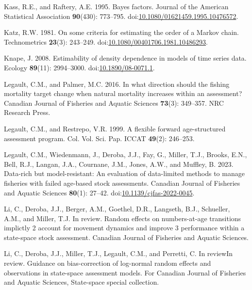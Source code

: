 \documentclass[
  12pt,
]{article}
\newlength{\cslhangindent}
\newlength{\cslentryspacingunit} %
\newenvironment{CSLReferences}[2] %
 {%
  \setlength{\parindent}{0pt}
  \ifodd #1
  \let\oldpar\par
  \def\par{\hangindent=\cslhangindent\oldpar}
  \fi
  \setlength{\parskip}{#2\cslentryspacingunit}
 }%
 {}
\begin{document}
\begin{CSLReferences}{1}{0}
\leavevmode{}%
Kass, R.E., and Raftery, A.E. 1995. Bayes factors. Journal of the
American Statistical Association \textbf{90}(430): 773--795.
doi:\href{https://doi.org/10.1080/01621459.1995.10476572}{10.1080/01621459.1995.10476572}.

\leavevmode{}%
Katz, R.W. 1981. On some criteria for estimating the order of a {M}arkov
chain. Technometrics \textbf{23}(3): 243--249.
doi:\href{https://doi.org/10.1080/00401706.1981.10486293}{10.1080/00401706.1981.10486293}.

\leavevmode{}%
Knape, J. 2008. Estimability of density dependence in models of time
series data. Ecology \textbf{89}(11): 2994--3000.
doi:\href{https://doi.org/10.1890/08-0071.1}{10.1890/08-0071.1}.

\leavevmode{}%
Legault, C.M., and Palmer, M.C. 2016. In what direction should the
fishing mortality target change when natural mortality increases within
an assessment? Canadian Journal of Fisheries and Aquatic Sciences
\textbf{73}(3): 349--357. NRC Research Press.

\leavevmode{}%
Legault, C.M., and Restrepo, V.R. 1999. A flexible forward
age-structured assessment program. Col. Vol. Sci. Pap. ICCAT
\textbf{49}(2): 246--253.

\leavevmode{}%
Legault, C.M., Wiedenmann, J., Deroba, J.J., Fay, G., Miller, T.J.,
Brooks, E.N., Bell, R.J., Langan, J.A., Cournane, J.M., Jones, A.W., and
Muffley, B. 2023. Data-rich but model-resistant: An evaluation of
data-limited methods to manage fisheries with failed age-based stock
assessments. Canadian Journal of Fisheries and Aquatic Sciences
\textbf{80}(1): 27--42.
doi:\href{https://doi.org/10.1139/cjfas-2022-0045}{10.1139/cjfas-2022-0045}.

\leavevmode{}%
Li, C., Deroba, J.J., Berger, A.M., Goethel, D.R., Langseth, B.J.,
Schueller, A.M., and Miller, T.J. In review. Random effects on
numbers-at-age transitions implictly 2 account for movement dynamics and
improve 3 performance within a state-space stock assessment. Canadian
Journal of Fisheries and Aquatic Sciences.

\leavevmode{}%
Li, C., Deroba, J.J., Miller, T.J., Legault, C.M., and Perretti, C. In
reviewIn review. Guidance on bias-correction of log-normal random
effects and observations in state-space assessment models. For Canadian
Journal of Fisheries and Aquatic Sciences, State-space special
collection.


\end{CSLReferences}
\end{document}
